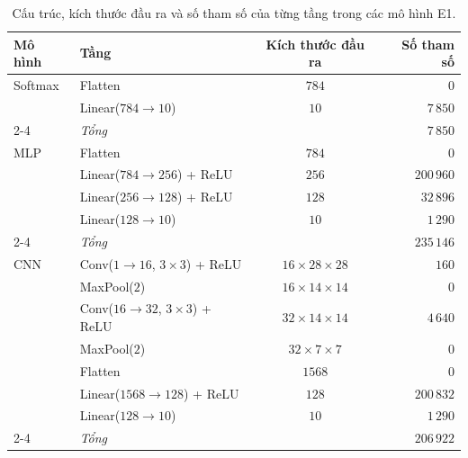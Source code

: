 \documentclass[a4paper,12pt]{article}
\begin{document}
\begin{table}[t]
    \centering
    \caption{Cấu trúc, kích thước đầu ra và số tham số của từng tầng trong các mô hình E1.}
    \label{tab:e1-arch}
    \small
    \begin{tabular}{llcr}
        \toprule
        Mô hình & Tầng                               & Kích thước đầu ra    & Số tham số \\
        \midrule
        Softmax & Flatten                            & $784$                & $0$        \\
                & Linear($784\to10$)                 & $10$                 & $7\,850$   \\
        \cmidrule(lr){2-4}
                & \textit{Tổng}                      &                      & $7\,850$   \\
        \midrule
        MLP     & Flatten                            & $784$                & $0$        \\
                & Linear($784\to256$) + ReLU         & $256$                & $200\,960$ \\
                & Linear($256\to128$) + ReLU         & $128$                & $32\,896$  \\
                & Linear($128\to10$)                 & $10$                 & $1\,290$   \\
        \cmidrule(lr){2-4}
                & \textit{Tổng}                      &                      & $235\,146$ \\
        \midrule
        CNN     & Conv($1\to16$, $3\times3$) + ReLU  & $16\times28\times28$ & $160$      \\
                & MaxPool($2$)                       & $16\times14\times14$ & $0$        \\
                & Conv($16\to32$, $3\times3$) + ReLU & $32\times14\times14$ & $4\,640$   \\
                & MaxPool($2$)                       & $32\times7\times7$   & $0$        \\
                & Flatten                            & $1568$               & $0$        \\
                & Linear($1568\to128$) + ReLU        & $128$                & $200\,832$ \\
                & Linear($128\to10$)                 & $10$                 & $1\,290$   \\
        \cmidrule(lr){2-4}
                & \textit{Tổng}                      &                      & $206\,922$ \\
        \bottomrule
    \end{tabular}
\end{table}
\end{document}
